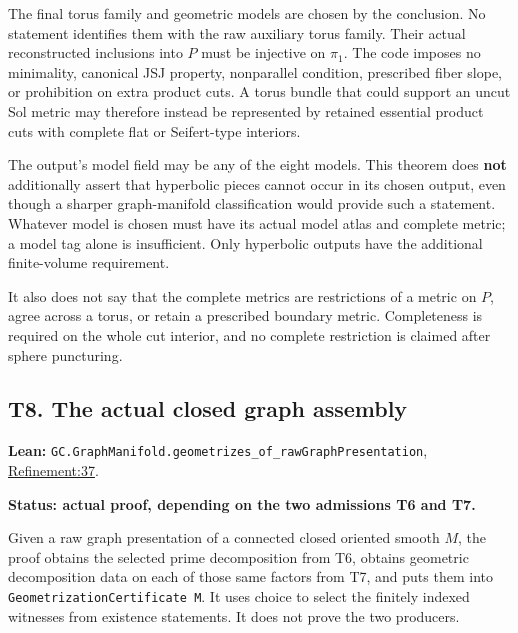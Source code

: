 \documentclass[
  letterpaper,
  11pt]{article}
\begin{document}
The final torus family and geometric models are chosen by the
conclusion. No statement identifies them with the raw auxiliary torus
family. Their actual reconstructed inclusions into \(P\) must be
injective on \(\pi_1\). The code imposes no minimality, canonical JSJ
property, nonparallel condition, prescribed fiber slope, or prohibition
on extra product cuts. A torus bundle that could support an uncut Sol
metric may therefore instead be represented by retained essential
product cuts with complete flat or Seifert-type interiors.

The output's model field may be any of the eight models. This theorem
does \textbf{not} additionally assert that hyperbolic pieces cannot
occur in its chosen output, even though a sharper graph-manifold
classification would provide such a statement. Whatever model is chosen
must have its actual model atlas and complete metric; a model tag alone
is insufficient. Only hyperbolic outputs have the additional
finite-volume requirement.

It also does not say that the complete metrics are restrictions of a
metric on \(P\), agree across a torus, or retain a prescribed boundary
metric. Completeness is required on the whole cut interior, and no
complete restriction is claimed after sphere puncturing.

\subsection{T8. The actual closed graph assembly}\label{t8}

\textbf{Lean:}
{\small\texttt{GC.\allowbreak{}Graph\allowbreak{}Manifold.\allowbreak{}geometrizes\_\allowbreak{}of\_\allowbreak{}raw\allowbreak{}Graph\allowbreak{}Presentation}},
\href{https://github.com/qinz1yang/differential-geometry-dev/blob/ea0fae60ee01ef8c8d9b57a51794c6538f679c5d/DifferentialGeometry/Topology/ThreeManifold/GraphManifold/Refinement.lean\#L37}{Refinement:37}.

\textbf{Status: actual proof, depending on the two admissions T6 and
T7.}

Given a raw graph presentation of a connected closed oriented smooth
\(M\), the proof obtains the selected prime decomposition from T6,
obtains geometric decomposition data on each of those same factors from
T7, and puts them into
{\small\texttt{Geometrization\allowbreak{}Certificate M}}. It uses
choice to select the finitely indexed witnesses from existence
statements. It does not prove the two producers.
\end{document}
